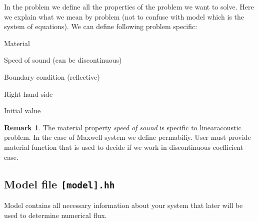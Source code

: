 \documentclass[a4paper,12pt]{article}
\theoremstyle{definition}
\theoremstyle{definition}
\newtheorem{Rem}[Def]{Remark}
\begin{document}
In the problem we define all the properties of the problem we want to solve. Here we explain what we mean by problem (not to confuse with model which is the system of equations). We can define following problem specific:

Material



Speed of sound (can be discontinuous)




Boundary condition (reflective)




Right hand side



Initial value



\begin{Rem}
	The material property \textit{speed of sound} is specific to linearacoustic problem. In the case of Maxwell system we define permabiliy. User must provide material function that is used to decide if we work in discontinuous coefficient case.
\end{Rem}


\subsection{Model file \lstinline{[model].hh} }

Model contains all necessary information about your system that later will be used to determine numerical flux. 





\end{document}
